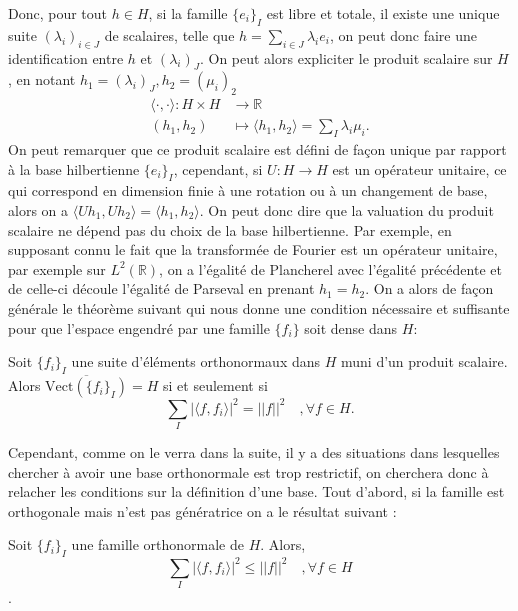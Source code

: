 Donc, pour tout $h \in H$, si la famille $\{e_i\}_I$ est libre et totale, il existe une unique suite $(\lambda_i)_{i \in J}$ de scalaires, telle que $ h = \sum_{i \in J} \lambda_i e_i$, on peut donc faire une identification entre $h$ et $(\lambda_i)_J$.
	On peut alors expliciter le produit scalaire sur $H$, en notant $h_1 = (\lambda_i)_J, h_2=(\mu_i)_2$
\begin{align}
	\langle \cdot, \cdot \rangle :  H \times H &\longrightarrow \mathbb{R} \\
		(h_1, h_2 ) &\longmapsto \langle h_1, h_2 \rangle = \sum_I \lambda_i \mu_i.
\end{align}
On peut remarquer que ce produit scalaire est défini de façon unique par rapport à la base hilbertienne $\{e_i\}_I$, cependant, si $U:H\rightarrow H$ est un opérateur unitaire, ce qui correspond en dimension finie à une rotation ou à un changement de base, alors on a $\langle Uh_1, Uh_2 \rangle = \langle h_1, h_2 \rangle$.
On peut donc dire que la valuation du produit scalaire ne dépend pas du choix de la base hilbertienne.
Par exemple,  en supposant connu le fait que la transformée de Fourier est un opérateur unitaire, par exemple sur $L^2(\mathbb{R})$, on a l'égalité de Plancherel avec l'égalité précédente et de celle-ci découle l'égalité de Parseval en prenant $h_1 = h_2$.
On a alors de façon générale le théorème suivant qui nous donne une condition nécessaire et suffisante pour que l'espace engendré par une famille $\{f_i\}$ soit dense dans $H$:
\begin{theoreme}
	Soit $\{f_i\}_I$ une suite d'éléments orthonormaux dans $H$ muni d'un produit scalaire.
	Alors $\overline{\text{Vect}(\{f_i\}_I)} = H$ si et seulement si 
	\begin{equation*}
		\sum_I |\langle f, f_i\rangle|^2 = ||f||^2 \quad, \forall f \in H.
	\end{equation*}
\end{theoreme}
Cependant, comme on le verra dans la suite, il y a des situations dans lesquelles chercher à avoir une base orthonormale est trop restrictif, on cherchera donc à relacher les conditions sur la définition d'une base.
\newline
Tout d'abord, si la famille est orthogonale mais n'est pas génératrice on a le résultat suivant :
\begin{theoreme}
	Soit $\{f_i\}_I$ une famille orthonormale de $H$.
	Alors,
	\begin{equation*}
		\sum_I |\langle f, f_i \rangle|^2 \leq ||f||^2 \quad, \forall f \in H
	\end{equation*}.
\end{theoreme}
